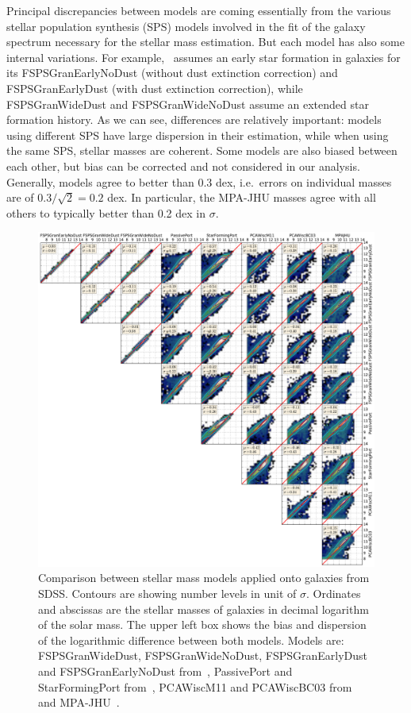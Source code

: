 Principal discrepancies between models are coming essentially from the various
stellar population synthesis (SPS) models involved in the fit of the galaxy
spectrum necessary for the stellar mass estimation. But each model has also
some internal variations. For example,~\cite{Conroy+09} assumes an early star
formation in galaxies for its FSPSGranEarlyNoDust (without dust extinction
correction) and FSPSGranEarlyDust (with dust extinction correction), while
FSPSGranWideDust and FSPSGranWideNoDust assume an extended star formation
history. As we can see, differences are relatively important: models using
different SPS have large dispersion in their estimation, while when using the
same SPS, stellar masses are coherent. Some models are also biased between each
other, but bias can be corrected and not considered in our analysis. Generally,
models agree to better than 0.3 dex, i.e.\ errors on individual masses are of
$0.3 / \sqrt{2} = 0.2$ dex. In particular, the MPA-JHU masses agree with all
others to typically better than 0.2 dex in $\sigma$.

\begin{figure}[htp]
    \centering
    \includegraphics[width=\linewidth]{figures/sdss/stellar_mass_models.pdf}
    \caption{Comparison between stellar mass models applied onto galaxies from
        SDSS\@. Contours are showing number levels in unit of $\sigma$.
        Ordinates and abscissas are the stellar masses of galaxies in decimal
        logarithm of the solar mass. The upper left box shows the bias and
        dispersion of the logarithmic difference between both models. Models
        are: FSPSGranWideDust, FSPSGranWideNoDust, FSPSGranEarlyDust and
        FSPSGranEarlyNoDust from~\cite{Conroy+09}, PassivePort and
        StarFormingPort from~\cite{Maraston+09}, PCAWiscM11 and PCAWiscBC03
    from~\cite{Chen+12} and MPA-JHU~\citep{Brinchmann+04, Kauffmann+03,
Tremonti+04}.\label{fig:stellar_mass_models}}
\end{figure}

